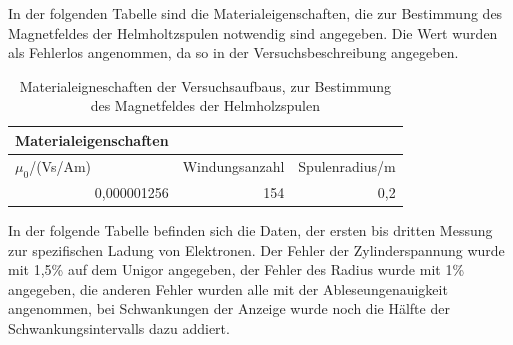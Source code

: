 \documentclass[12pt,a4paper]{article}
\begin{document}
In der folgenden Tabelle sind die Materialeigenschaften, die zur Bestimmung des Magnetfeldes der Helmholtzspulen notwendig sind angegeben. Die Wert wurden als Fehlerlos angenommen, da so in der Versuchsbeschreibung angegeben.

\begin{table}[htbp]
\caption{Materialeigneschaften der Versuchsaufbaus, zur Bestimmung des Magnetfeldes der Helmholzspulen}
\begin{center}
\begin{tabular}{|l|l|l|}
\hline
Materialeigenschaften &  &  \\ \hline
$\mu_0$/(Vs/Am) & Windungsanzahl & Spulenradius/m \\ \hline
\multicolumn{1}{|r|}{0,000001256} & \multicolumn{1}{r|}{154} & \multicolumn{1}{r|}{0,2} \\ \hline
\end{tabular}
\end{center}
\label{tab:1_m}
\end{table}



In der folgende Tabelle befinden sich die Daten, der ersten bis dritten Messung zur spezifischen Ladung von Elektronen. Der Fehler der Zylinderspannung wurde mit 1,5\% auf dem Unigor angegeben, der Fehler des Radius wurde mit 1\% angegeben, die anderen Fehler wurden alle mit der Ableseungenauigkeit angenommen, bei Schwankungen der Anzeige wurde noch die Hälfte der Schwankungsintervalls dazu addiert.
\end{document}
